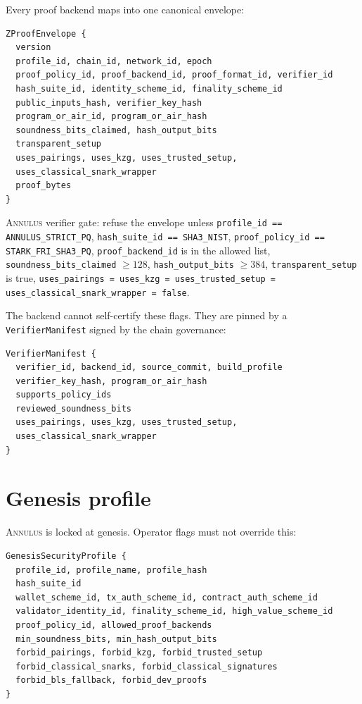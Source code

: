 \documentclass[11pt,a4paper]{article}
\newcommand{\Annulus}{\textsc{Annulus}}
\begin{document}
Every proof backend maps into one canonical envelope:

\begin{verbatim}
ZProofEnvelope {
  version
  profile_id, chain_id, network_id, epoch
  proof_policy_id, proof_backend_id, proof_format_id, verifier_id
  hash_suite_id, identity_scheme_id, finality_scheme_id
  public_inputs_hash, verifier_key_hash
  program_or_air_id, program_or_air_hash
  soundness_bits_claimed, hash_output_bits
  transparent_setup
  uses_pairings, uses_kzg, uses_trusted_setup,
  uses_classical_snark_wrapper
  proof_bytes
}
\end{verbatim}

\noindent
\Annulus{} verifier gate: refuse the envelope unless
\texttt{profile\_id == ANNULUS\_STRICT\_PQ},
\texttt{hash\_suite\_id == SHA3\_NIST},
\texttt{proof\_policy\_id == STARK\_FRI\_SHA3\_PQ},
\texttt{proof\_backend\_id} is in the allowed list,
\texttt{soundness\_bits\_claimed} $\geq 128$,
\texttt{hash\_output\_bits} $\geq 384$,
\texttt{transparent\_setup} is true,
\texttt{uses\_pairings = uses\_kzg = uses\_trusted\_setup =
uses\_classical\_snark\_wrapper = false}.

The backend cannot self-certify these flags. They are pinned by a
\texttt{VerifierManifest} signed by the chain governance:

\begin{verbatim}
VerifierManifest {
  verifier_id, backend_id, source_commit, build_profile
  verifier_key_hash, program_or_air_hash
  supports_policy_ids
  reviewed_soundness_bits
  uses_pairings, uses_kzg, uses_trusted_setup,
  uses_classical_snark_wrapper
}
\end{verbatim}

\section{Genesis profile}
\label{sec:genesis}

\Annulus{} is locked at genesis. Operator flags must not override
this:

\begin{verbatim}
GenesisSecurityProfile {
  profile_id, profile_name, profile_hash
  hash_suite_id
  wallet_scheme_id, tx_auth_scheme_id, contract_auth_scheme_id
  validator_identity_id, finality_scheme_id, high_value_scheme_id
  proof_policy_id, allowed_proof_backends
  min_soundness_bits, min_hash_output_bits
  forbid_pairings, forbid_kzg, forbid_trusted_setup
  forbid_classical_snarks, forbid_classical_signatures
  forbid_bls_fallback, forbid_dev_proofs
}
\end{verbatim}
\end{document}
